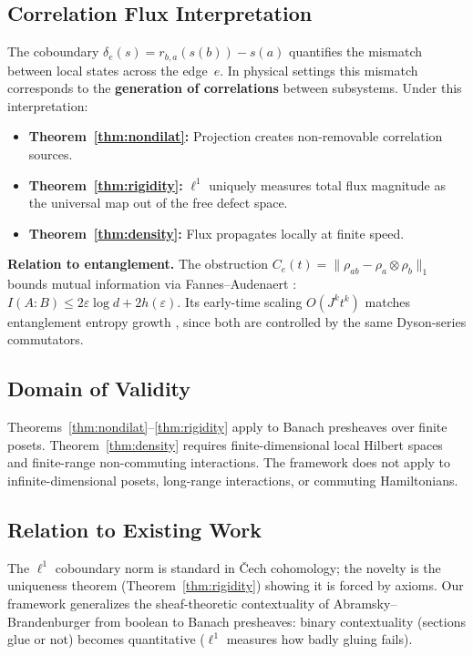 \documentclass[12pt,a4paper]{amsart}
\theoremstyle{plain}
\theoremstyle{definition}
\theoremstyle{remark}
\begin{document}
\subsection{Correlation Flux Interpretation}

The coboundary $\delta_e(s) = r_{b,a}(s(b)) - s(a)$ quantifies the
mismatch between local states across the edge~$e$. In physical
settings this mismatch corresponds to the \textbf{generation of
correlations} between subsystems. Under this interpretation:
\begin{itemize}[leftmargin=2em]
  \item \textbf{Theorem~\ref{thm:nondilat}:}
    Projection creates non-removable correlation sources.
  \item \textbf{Theorem~\ref{thm:rigidity}:}
    $\ell^1$ uniquely measures total flux magnitude as the universal
    map out of the free defect space.
  \item \textbf{Theorem~\ref{thm:density}:}
    Flux propagates locally at finite speed.
\end{itemize}

\noindent\textbf{Relation to entanglement.}
The obstruction
$C_e(t) = \|\rho_{ab} - \rho_a \otimes \rho_b\|_1$ bounds mutual
information via Fannes--Audenaert \cite{Audenaert07}:
$I(A{:}B) \leq 2\varepsilon \log d + 2h(\varepsilon)$. Its
early-time scaling $O(J^k t^k)$ matches entanglement entropy growth
\cite{CC05,KH13}, since both are controlled by the same Dyson-series
commutators.

\subsection{Domain of Validity}

Theorems~\ref{thm:nondilat}--\ref{thm:rigidity} apply to Banach
presheaves over finite posets. Theorem~\ref{thm:density} requires
finite-dimensional local Hilbert spaces and finite-range non-commuting
interactions. The framework does not apply to infinite-dimensional
posets, long-range interactions, or commuting Hamiltonians.

\subsection{Relation to Existing Work}

The $\ell^1$ coboundary norm is standard in \v{C}ech cohomology; the
novelty is the uniqueness theorem (Theorem~\ref{thm:rigidity}) showing
it is forced by axioms. Our framework generalizes the sheaf-theoretic
contextuality of Abramsky--Brandenburger \cite{AB11} from boolean to
Banach presheaves: binary contextuality (sections glue or not) becomes
quantitative ($\ell^1$ measures how badly gluing fails).
\end{document}

